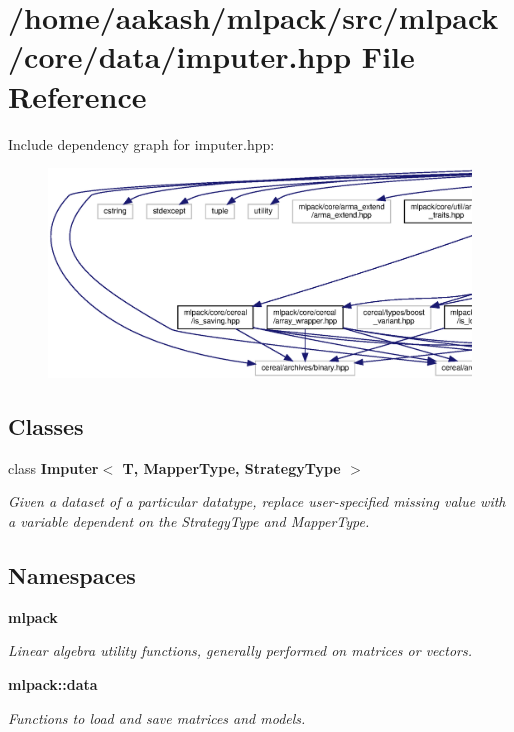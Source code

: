 \section{/home/aakash/mlpack/src/mlpack/core/data/imputer.hpp File Reference}
\label{imputer_8hpp}
Include dependency graph for imputer.\+hpp\+:
\nopagebreak
\begin{figure}[H]
\begin{center}
\leavevmode
\includegraphics[width=350pt]{imputer_8hpp__incl}
\end{center}
\end{figure}
\subsection*{Classes}
\begin{DoxyCompactItemize}
\item 
class \textbf{ Imputer$<$ T, Mapper\+Type, Strategy\+Type $>$}
\begin{DoxyCompactList}\small\item\em Given a dataset of a particular datatype, replace user-\/specified missing value with a variable dependent on the Strategy\+Type and Mapper\+Type. \end{DoxyCompactList}\end{DoxyCompactItemize}
\subsection*{Namespaces}
\begin{DoxyCompactItemize}
\item 
 \textbf{ mlpack}
\begin{DoxyCompactList}\small\item\em Linear algebra utility functions, generally performed on matrices or vectors. \end{DoxyCompactList}\item 
 \textbf{ mlpack\+::data}
\begin{DoxyCompactList}\small\item\em Functions to load and save matrices and models. \end{DoxyCompactList}\end{DoxyCompactItemize}


